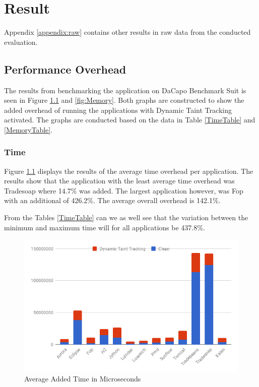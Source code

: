 \chapter{Result}
Appendix \ref{appendix:raw} contains other results in raw data from the conducted evaluation.


\section{Performance Overhead}
The results from benchmarking the application on DaCapo Benchmark Suit \parencite{dacapo} is seen in Figure \ref{fig:Time} and \ref{fig:Memory}. Both graphs are constructed to show the added overhead of running the applications with Dynamic Taint Tracking activated. The graphs are conducted based on the data in Table \ref{TimeTable} and \ref{MemoryTable}.


\subsection{Time}
Figure \ref{fig:Time} displays the results of the average time overhead per application. The results show that the application with the least average time overhead was Tradesoap where 14.7\% was added. The largest application however, was Fop with an additional of 426.2\%. The average overall overhead is 142.1\%.

From the Tables \ref{TimeTable} can we as well see that the variation between the minimum and maximum time will for all applications be 437.8\%.

\begin{figure}[!h]
	\centering
	\includegraphics[width=\textwidth]{images/Time.png}
	\caption{Average Added Time in Microseconds}
	\label{fig:Time}
\end{figure}


